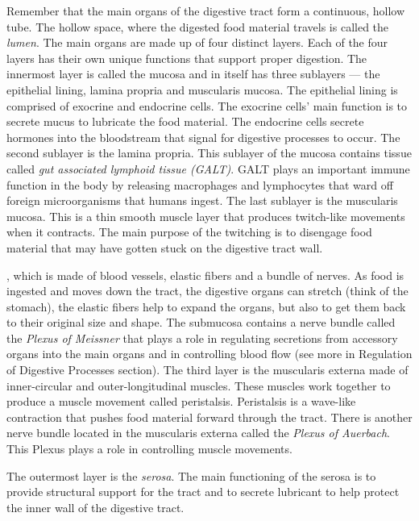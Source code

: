 \documentclass{tufte-handout}
\begin{document}
Remember that the main organs of the digestive tract form a continuous, hollow tube. The hollow space, where the digested food material travels is called the \emph{lumen}. The main organs are made up of four distinct layers. Each of the four layers has their own unique functions that support proper digestion. The innermost layer is called the mucosa and in itself has three sublayers --- the epithelial lining, lamina propria and muscularis mucosa. The epithelial lining is comprised of exocrine and endocrine cells. The exocrine cells' main function is to secrete mucus to lubricate the food material. The endocrine cells secrete hormones into the bloodstream that signal for digestive processes to occur. The second sublayer is the lamina propria. This sublayer of the mucosa contains tissue called \emph{gut associated lymphoid tissue (GALT)}. GALT plays an important immune function in the body by releasing macrophages and lymphocytes that ward off foreign microorganisms that humans ingest. The last sublayer is the muscularis mucosa. This is a thin smooth muscle layer that produces twitch-like movements when it contracts. The main purpose of the twitching is to disengage food material that may have gotten stuck on the digestive tract wall.

, which is made of blood vessels, elastic fibers and a bundle of nerves. As food is ingested and moves down the tract, the digestive organs can stretch (think of the stomach), the elastic fibers help to expand the organs, but also to get them back to their original size and shape. The submucosa contains a nerve bundle called the \emph{Plexus of Meissner} that plays a role in regulating secretions from accessory organs into the main organs and in controlling blood flow (see more in Regulation of Digestive Processes section). The third layer is the muscularis externa made of inner-circular and outer-longitudinal muscles. These muscles work together to produce a muscle movement called peristalsis. Peristalsis is a wave-like contraction that pushes food material forward through the tract. There is another nerve bundle located in the muscularis externa called the \emph{Plexus of Auerbach}. This Plexus plays a role in controlling muscle movements. 

The outermost layer is the \emph{serosa}. The main functioning of the serosa is to provide structural support for the tract and to secrete lubricant to help protect the inner wall of the digestive tract.
\end{document}
